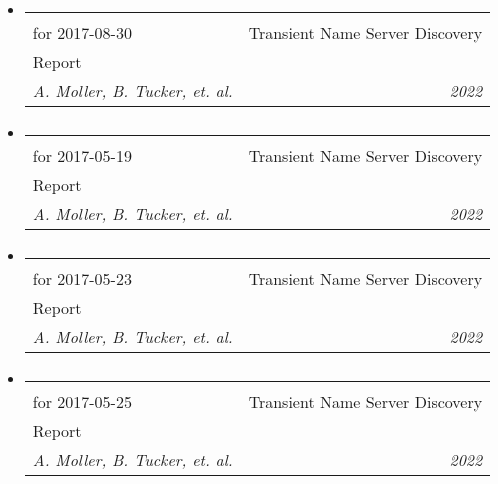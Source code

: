 \documentclass[letterpaper,11pt]{article}
\makeatletter
\newcommand{\resumeItem}[1]{
  \item\small{
    {#1 \vspace{-2pt}}
  }
}
\newcommand{\resumeSubheading}[4]{
  \vspace{-2pt}\item
    \begin{tabular*}{0.97\textwidth}[t]{l@{\extracolsep{\fill}}r}
      \textbf{#1} & #2 \\
      \textit{\small#3} & \textit{\small #4} \\
    \end{tabular*}\vspace{-7pt}
}
\newcommand{\resumeSubHeadingListStart}{\begin{itemize}[leftmargin=0.15in, label={}]}
\newcommand{\resumeSubHeadingListEnd}{\end{itemize}}
\newcommand{\resumeItemListStart}{\begin{itemize}}
\newcommand{\resumeItemListEnd}{\end{itemize}\vspace{-5pt}}
\newcommand{\publicationElement}[5]{%
    \resumeSubHeadingListStart
        \resumeSubheading
            {#1}
            {#2}
            {#3}
            {#4}
            \ifthenelse{\isempty{#5}}{}{%
                \resumeItemListStart
                    \renewcommand*{\do}[1]{\resumeItem{##1}}
                    \docsvlist{#5}%
                \resumeItemListEnd
            }%
    \resumeSubHeadingListEnd
}
\makeatother
\begin{document}
        \publicationElement{SkyMapper Transient Discovery Report\\for 2017-08-30}{Transient Name Server Discovery\\Report}{A. Moller, B. Tucker, et. al.}{2022}{}
        \publicationElement{SkyMapper Transient Discovery Report\\for 2017-05-19}{Transient Name Server Discovery\\Report}{A. Moller, B. Tucker, et. al.}{2022}{}
        \publicationElement{SkyMapper Transient Discovery Report\\for 2017-05-23}{Transient Name Server Discovery\\Report}{A. Moller, B. Tucker, et. al.}{2022}{}
        \publicationElement{SkyMapper Transient Discovery Report\\for 2017-05-25}{Transient Name Server Discovery\\Report}{A. Moller, B. Tucker, et. al.}{2022}{}

\end{document}
